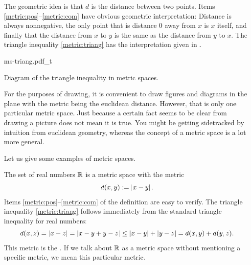 The geometric idea is that $d$ is the distance between two points. 
Items \ref{metric:pos}--\ref{metric:com} have obvious geometric
interpretation: Distance is always nonnegative, the only point that is
distance 0 away from $x$ is $x$ itself, and finally that the distance from
$x$ to $y$ is the same as the distance from $y$ to $x$.  The triangle
inequality \ref{metric:triang} has the interpretation given in
.
\begin{myfigureht}
{ms-triang.pdf_t}
\caption{Diagram of the triangle inequality in metric spaces.\label{fig:mstriang}}
\end{myfigureht}

For the purposes of drawing, it is convenient to draw figures and
diagrams in the plane with the metric being the euclidean distance.
However, that is only one particular metric space.  Just because a
certain fact seems to be clear from drawing a picture does not mean it is
true.  You might be getting sidetracked by intuition from euclidean
geometry,
whereas the concept of a metric space is a lot more general.

Let us give some examples of metric spaces.

\begin{example}
The set of real numbers ${\mathbb{R}}$ is a metric space with the metric
\begin{equation*}
d(x,y) := \left\lvert {x-y} \right\rvert .
\end{equation*}
Items \ref{metric:pos}--\ref{metric:com} of the definition
are easy to verify.  The
triangle inequality \ref{metric:triang} follows immediately
from the standard triangle inequality for real numbers:
\begin{equation*}
d(x,z) = \left\lvert {x-z} \right\rvert = 
\left\lvert {x-y+y-z} \right\rvert \leq
\left\lvert {x-y} \right\rvert+\left\lvert {y-z} \right\rvert =
d(x,y)+ d(y,z) .
\end{equation*}
This metric is the \emph{}.  If we talk
about ${\mathbb{R}}$ as a metric space without mentioning a specific metric, we 
mean this particular metric.
\end{example}


